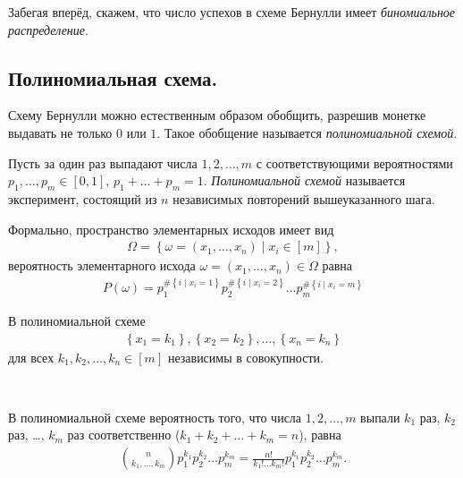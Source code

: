 \documentclass[../main.tex]{subfiles}
\begin{document}
Забегая вперёд, скажем, что число успехов в схеме Бернулли имеет \textit{биномиальное распределение}.

\subsection{Полиномиальная схема.}

Схему Бернулли можно естественным образом обобщить, разрешив монетке выдавать не только $ 0 $ или $ 1 $. Такое обобщение называется \textit{полиномиальной схемой}.
\begin{df}
 Пусть за один раз выпадают числа $ 1,2, \ldots, m $ с соответствующими вероятностями $p_1, \ldots, p_m \in [0,1]$, $p_1 + \ldots + p_m = 1$. \textit{Полиномиальной схемой} называется эксперимент, состоящий из $ n $ независимых повторений вышеуказанного шага.

 Формально, пространство элементарных исходов имеет вид
 \begin{align*}
  \Omega = \left\{ \omega = (x_1, \ldots, x_n) \mid x_i \in [m] \right\},
 \end{align*} вероятность элементарного исхода $ \omega = (x_1, \ldots, x_n) \in \Omega $ равна
 \begin{align*}
  P(\omega) = p_1^{\# \left\{ i \mid x_i = 1 \right\}} p_2^{\# \left\{ i \mid x_i = 2 \right\}} \ldots p_m^{\# \left\{ i \mid x_i = m \right\}}
 \end{align*} 
\end{df}

\begin{prop}
 В полиномиальной схеме
 \begin{align*}
  \left\{ x_1 = k_1 \right\}, \left\{ x_2=k_2 \right\}, \ldots, \left\{ x_n = k_n \right\}
 \end{align*} для всех $ k_1, k_2, \ldots, k_n \in [m] $ независимы в совокупности.
\end{prop}

\begin{prop}\

 В полиномиальной схеме вероятность того, что числа $ 1,2,\ldots, m $ выпали $ k_1 $ раз, $ k_2 $ раз, \ldots, $ k_m $ раз соответственно ($ k_1 + k_2 + \ldots + k_m=n $), равна
 \begin{align*}
  \binom n {k_1,\ldots,k_m} p_1^{k_1} p_2^{k_2} \ldots p_m^{k_m} = \frac{n!}{k_1! \ldots k_m!} p_1^{k_1} p_2^{k_2} \ldots p_m^{k_m}.
 \end{align*}
\end{prop}
\end{document}
